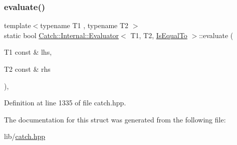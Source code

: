 \subsubsection{\texorpdfstring{evaluate()}{evaluate()}}
{\footnotesize\ttfamily template$<$typename T1 , typename T2 $>$ \\
static bool \hyperlink{class_catch_1_1_internal_1_1_evaluator}{Catch\+::\+Internal\+::\+Evaluator}$<$ T1, T2, \hyperlink{namespace_catch_1_1_internal_ae3f96598a7858155750bf38e7295d83ea30e0accba6ec8384f4383b04dd2a6a9e}{Is\+Equal\+To} $>$\+::evaluate (\begin{DoxyParamCaption}\item[{T1 const \&}]{lhs,  }\item[{T2 const \&}]{rhs }\end{DoxyParamCaption})\hspace{0.3cm}{\ttfamily [inline]}, {\ttfamily [static]}}



Definition at line 1335 of file catch.\+hpp.



The documentation for this struct was generated from the following file\+:\begin{DoxyCompactItemize}
\item 
lib/\hyperlink{catch_8hpp}{catch.\+hpp}\end{DoxyCompactItemize}
